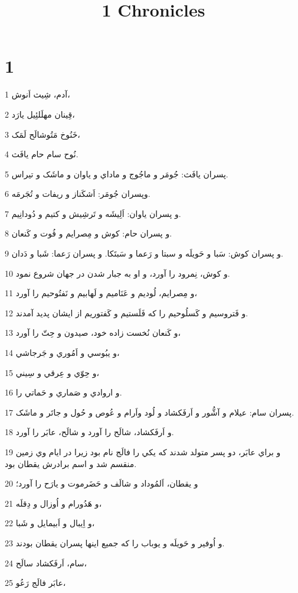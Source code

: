 

\title{1 Chronicles}

 
\chapter{1}

\par 1 آدم، شِيث اَنوش،
\par 2 قِينان مهلَلئِيل يارَد،
\par 3 خَنُوخ مَتُوشالَح لَمَک،
\par 4 نُوح سام حام يافَث.
\par 5 پسران يافَث: جُومَر و ماجُوج و ماداي و ياوان و ماشَک و تيراس.
\par 6 وپسران جُومَر: اَشکَناز و ريفات و تُجَرمَه.
\par 7 و پسران ياوان: اَلِيشَه و تَرشِيش و کتيم و دُودانِيم.
\par 8 و پسران حام: کوش و مِصرايم و فُوت و کَنعان.
\par 9 و پسران کوش: سَبا و حَويلَه و سبتا و رَعما و سَبتَکا. و پسران رَعما: شَبا و دَدان.
\par 10 و کوش، نِمرود را آورد، و او به جبار شدن در جهان شروع نمود.
\par 11 و مِصرايم، لُوديم و عَنَاميم و لَهابيم و نَفتُوحيم را آورد،
\par 12 و فَتروسيم و کَسلُوحيم را که فَلَستيم و کَفتوريم از ايشان پديد آمدند.
\par 13 و کَنعان نُخست زاده خود، صيدون و حِتّ را آورد،
\par 14 و يبُوسي و اَمُوري و جَرجاشي،
\par 15 و حِوّي و عِرقي و سِيني،
\par 16 و اروادي و صَماري و حَماتي را.
\par 17 پسران سام: عيلام و آشُّور و اَرفَکشاد و لُود واَرام و عُوص و حُول و جاتَر و ماشَک.
\par 18 و اَرفَکشاد، شالَح را آورد و شالَح، عابَر را آورد.
\par 19 و براي عابَر، دو پسر متولد شدند که يکي را فالَج نام بود زيرا در ايام وي زمين منقسم شد و اسم برادرش يقطان بود.
\par 20 و يقطان، اَلمُوداد و شالَف و حَضَرموت و يارَح را آورد؛
\par 21 و هَدُورام و اُوزال و دِقلَه،
\par 22 و اِيبال و اَبيمايل و شَبا،
\par 23 و اُوفير و حَويلَه و يوباب را که جميع اينها پسران يقطان بودند.
\par 24 سام، اَرفَکشاد سالَح،
\par 25 عابَر فالَج رَعُو،
